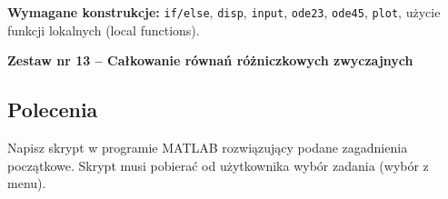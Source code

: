 \documentclass[a4paper,11pt]{article}
\begin{document}
\vspace{0.3cm}
\begin{ramka}
\textbf{Wymagane konstrukcje:}
\texttt{if/else}, \texttt{disp}, \texttt{input}, \texttt{ode23}, \texttt{ode45}, \texttt{plot}, użycie funkcji lokalnych (local functions).
\end{ramka}

\clearpage
\begin{center}
  {\large\bfseries Zestaw nr 13 \quad -- \quad Całkowanie równań różniczkowych zwyczajnych}
\end{center}
\hrulefill
\vspace{0.4cm}

\subsection*{Polecenia}

Napisz skrypt w programie MATLAB rozwiązujący podane zagadnienia początkowe. Skrypt musi pobierać od użytkownika wybór zadania (wybór z menu).
\end{document}
